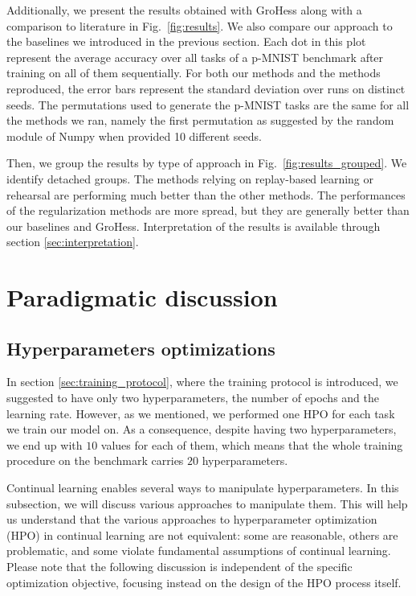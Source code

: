\documentclass[11pt]{article}
\begin{document}
\vspace{2mm}
\noindent
Additionally, we present the results obtained with GroHess along with a comparison to literature in Fig.~\ref{fig:results}. We also compare our approach to the baselines we introduced in the previous section. Each dot in this plot represent the average accuracy over all tasks of a p-MNIST benchmark after training on all of them sequentially. For both our methods and the methods reproduced, the error bars represent the standard deviation over runs on distinct seeds. The permutations used to generate the p-MNIST tasks are the same for all the methods we ran, namely the first permutation as suggested by the random module of Numpy when provided 10 different seeds.

\vspace{2mm}
\noindent
Then, we group the results by type of approach in Fig.~\ref{fig:results_grouped}. We identify detached groups. The methods relying on replay-based learning or rehearsal are performing much better than the other methods. The performances of the regularization methods are more spread, but they are generally better than our baselines and GroHess. Interpretation of the results is available through section \ref{sec:interpretation}.



\section{Paradigmatic discussion}



\subsection{Hyperparameters optimizations}


In section \ref{sec:training_protocol}, where the training protocol is introduced, we suggested to have only two hyperparameters, the number of epochs and the learning rate. However, as we mentioned, we performed one HPO for each task we train our model on. As a consequence, despite having two hyperparameters, we end up with $10$ values for each of them, which means that the whole training procedure on the benchmark carries $20$ hyperparameters. 

\vspace{2mm}
\noindent
Continual learning enables several ways to manipulate hyperparameters. In this subsection, we will discuss various approaches to manipulate them. This will help us understand that the various approaches to hyperparameter optimization (HPO) in continual learning are not equivalent: some are reasonable, others are problematic, and some violate fundamental assumptions of continual learning. Please note that the following discussion is independent of the specific optimization objective, focusing instead on the design of the HPO process itself.
\end{document}
